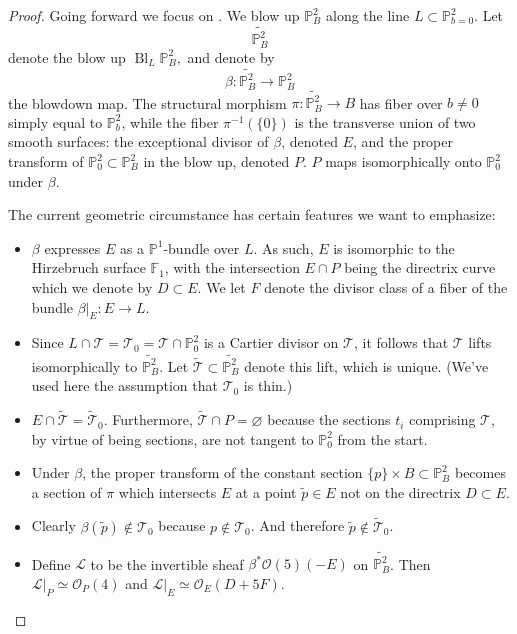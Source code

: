 \documentclass{article}
\renewcommand{\P}{\mathbb{P}}
\renewcommand{\O}{\mathcal{O}}
\DeclareMathOperator{\Bl}{Bl}
\begin{document}
\begin{proof}
    Going forward we focus on .  We blow up $\P^{2}_{B}$  along the line $L \subset \P^{2}_{b=0}$. Let $$\widetilde{\P^{2}_{B}}$$ denote the blow up $\Bl_{L} \P^{2}_{B},$ and denote by $$\beta: \widetilde{\P^{2}_{B}} \to \P^{2}_{B}$$ the blowdown map.  The structural morphism $\pi: \widetilde{\P^{2}_{B}} \to B$ has fiber over $b \neq 0$ simply equal to $\P^{2}_{b}$, while the fiber $\pi^{-1}(\{0\})$ is the transverse union of two smooth surfaces: the exceptional divisor of $\beta$, denoted $E$,  and the proper transform of $\P^{2}_{0} \subset \P^{2}_{B}$ in the blow up, denoted $P$. $P$ maps isomorphically onto $\P^{2}_{0}$ under $\beta$. 

    The current geometric circumstance has certain features we want to emphasize:
\begin{itemize}
\item $\beta$ expresses $E$ as a $\P^{1}$-bundle over $L$. As such, $E$ is isomorphic to the Hirzebruch surface $\mathbb{F}_{1}$, with the intersection $E \cap P$ being the directrix curve which we denote by $D \subset E$. We let $F$ denote the divisor class of a fiber of the bundle $\beta|_{E}: E \to L$.

\item Since $L \cap \mathcal{T} = \mathcal{T}_{0} = \mathcal{T} \cap \P^{2}_{0}$ is a Cartier divisor on $\mathcal{T}$, it follows that $\mathcal{T}$ lifts isomorphically to $\widetilde{\P^{2}_{B}}$.  Let $\widetilde{\mathcal{T}} \subset \widetilde{\P^{2}_{B}}$ denote this lift, which is unique. (We've used here the assumption that $\mathcal{T}_{0}$ is thin.)  

\item $E \cap \widetilde{\mathcal{T}} = \widetilde{\mathcal{T}}_{0}$. Furthermore, $\widetilde{\mathcal{T}} \cap P = \varnothing$ because the sections $t_{i}$ comprising $\mathcal{T}$, by virtue of being sections, are not tangent to $\P^{2}_{0}$ from the start. 

\item Under $\beta$, the proper transform of the constant section $\{p\} \times B \subset \P^{2}_{B}$ becomes a section of $\pi$ which intersects $E$ at a point $\widetilde{p} \in E$ not on the directrix $D \subset E$.  

\item Clearly $\beta(\widetilde{p}) \notin \mathcal{T}_{0}$ because $p \notin \mathcal{T}_{0}$. And therefore $\widetilde{p} \notin \widetilde{\mathcal{T}}_{0}$.

\item Define $\mathcal{L}$ to be the invertible sheaf $\beta^{*}\O(5)(-E)$ on $\widetilde{\P_{B}^{2}}$. Then $\mathcal{L}|_{P} \simeq \O_{P}(4)$ and $\mathcal{L}|_{E} \simeq \O_{E}(D+5F)$.
\end{itemize}


\end{proof}
\end{document}
